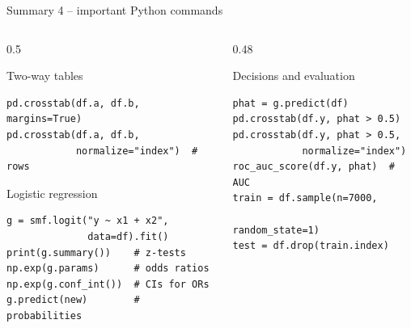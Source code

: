 \documentclass[aspectratio=169,11pt]{beamer}
\begin{document}
\begin{frame}[fragile]{Summary 4 -- important Python commands}
  \lstset{aboveskip=2pt,belowskip=2pt}
  \begin{columns}[T]
    \begin{column}{0.5\textwidth}
      \begin{block}{Two-way tables}
\begin{lstlisting}
pd.crosstab(df.a, df.b, margins=True)
pd.crosstab(df.a, df.b,
            normalize="index")  # rows
\end{lstlisting}
      \end{block}
      \begin{block}{Logistic regression}
\begin{lstlisting}
g = smf.logit("y ~ x1 + x2",
              data=df).fit()
print(g.summary())    # z-tests
np.exp(g.params)      # odds ratios
np.exp(g.conf_int())  # CIs for ORs
g.predict(new)        # probabilities
\end{lstlisting}
      \end{block}
    \end{column}
    \begin{column}{0.48\textwidth}
      \begin{block}{Decisions and evaluation}
\begin{lstlisting}
phat = g.predict(df)
pd.crosstab(df.y, phat > 0.5)
pd.crosstab(df.y, phat > 0.5,
            normalize="index")
roc_auc_score(df.y, phat)  # AUC
train = df.sample(n=7000,
                  random_state=1)
test = df.drop(train.index)
\end{lstlisting}
      \end{block}
    \end{column}
  \end{columns}
\end{frame}
\end{document}
